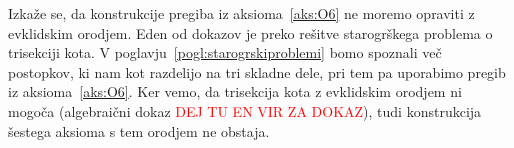 Izkaže se, da konstrukcije pregiba iz aksioma~\ref{aks:O6} ne moremo opraviti z evklidskim orodjem. Eden od dokazov je preko rešitve starogrškega problema o trisekciji kota. V poglavju~\ref{pogl:starogrskiproblemi} bomo spoznali več postopkov, ki nam kot razdelijo na tri skladne dele, pri tem pa uporabimo pregib iz aksioma~\ref{aks:O6}. Ker vemo, da trisekcija kota z evklidskim orodjem ni mogoča (algebraični dokaz \textcolor{red}{DEJ TU EN VIR ZA DOKAZ}), tudi konstrukcija šestega aksioma s tem orodjem ne obstaja.
